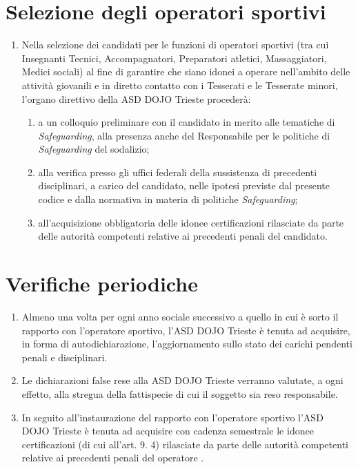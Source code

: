 \documentclass{djtsdoc}
\begin{document}
	\section{Selezione degli operatori sportivi}
	\begin{enumerate}
		\item Nella selezione dei candidati per le funzioni di operatori sportivi (tra cui Insegnanti Tecnici, Accompagnatori, Preparatori atletici, Massaggiatori, Medici sociali) al fine di garantire che siano idonei a operare nell'ambito delle attività giovanili e in diretto contatto con i Tesserati e le Tesserate minori, l'organo direttivo della ASD DOJO Trieste procederà:
		\begin{enumerate}
			\item a un colloquio preliminare con il candidato in merito alle tematiche di \textit{Safeguarding}, alla	presenza anche del Responsabile per le politiche di \textit{Safeguarding} del sodalizio;
			\item alla verifica presso gli uffici federali della sussistenza di precedenti disciplinari, a carico del candidato, nelle ipotesi previste dal presente codice e dalla normativa in materia di politiche \textit{Safeguarding};
			\item all'acquisizione obbligatoria delle idonee certificazioni rilasciate da parte delle autorità competenti relative ai precedenti penali del candidato.
		\end{enumerate}
	\end{enumerate}
	
	\section{Verifiche periodiche}
	\begin{enumerate}
		\item Almeno una volta per ogni anno sociale successivo a quello in cui è sorto il rapporto con l'operatore sportivo, l'ASD DOJO Trieste è tenuta ad acquisire, in forma di autodichiarazione, l'aggiornamento sullo stato dei carichi pendenti penali e disciplinari.
		\item Le dichiarazioni false rese alla ASD DOJO Trieste verranno valutate, a ogni effetto, alla stregua della fattispecie di cui il soggetto sia reso responsabile.
		\item In seguito all'instaurazione del rapporto con l'operatore sportivo  l'ASD DOJO Trieste è tenuta ad acquisire con cadenza semestrale le idonee certificazioni (di cui all'art. 9. 4) rilasciate da parte delle autorità competenti relative ai precedenti penali del operatore .
	\end{enumerate}
	
\end{document}
